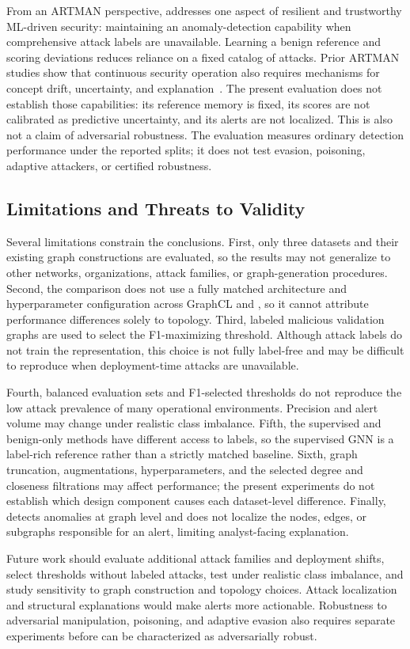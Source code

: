 From an ARTMAN perspective, \sysname{} addresses one aspect of resilient and trustworthy ML-driven security: maintaining an anomaly-detection capability when comprehensive attack labels are unavailable. Learning a benign reference and scoring deviations reduces reliance on a fixed catalog of attacks. Prior ARTMAN studies show that continuous security operation also requires mechanisms for concept drift, uncertainty, and explanation~\cite{jung2023modelselection,kolicic2024interpretable,kawanaka2025explainable}. The present evaluation does not establish those capabilities: its reference memory is fixed, its scores are not calibrated as predictive uncertainty, and its alerts are not localized. This is also not a claim of adversarial robustness. The evaluation measures ordinary detection performance under the reported splits; it does not test evasion, poisoning, adaptive attackers, or certified robustness.

\subsection{Limitations and Threats to Validity}

Several limitations constrain the conclusions. First, only three datasets and their existing graph constructions are evaluated, so the results may not generalize to other networks, organizations, attack families, or graph-generation procedures. Second, the comparison does not use a fully matched architecture and hyperparameter configuration across GraphCL and \sysname{}, so it cannot attribute performance differences solely to topology. Third, labeled malicious validation graphs are used to select the F1-maximizing threshold. Although attack labels do not train the representation, this choice is not fully label-free and may be difficult to reproduce when deployment-time attacks are unavailable.

Fourth, balanced evaluation sets and F1-selected thresholds do not reproduce the low attack prevalence of many operational environments. Precision and alert volume may change under realistic class imbalance. Fifth, the supervised and benign-only methods have different access to labels, so the supervised GNN is a label-rich reference rather than a strictly matched baseline. Sixth, graph truncation, augmentations, hyperparameters, and the selected degree and closeness filtrations may affect performance; the present experiments do not establish which design component causes each dataset-level difference. Finally, \sysname{} detects anomalies at graph level and does not localize the nodes, edges, or subgraphs responsible for an alert, limiting analyst-facing explanation.

Future work should evaluate additional attack families and deployment shifts, select thresholds without labeled attacks, test under realistic class imbalance, and study sensitivity to graph construction and topology choices. Attack localization and structural explanations would make alerts more actionable. Robustness to adversarial manipulation, poisoning, and adaptive evasion also requires separate experiments before \sysname{} can be characterized as adversarially robust.
